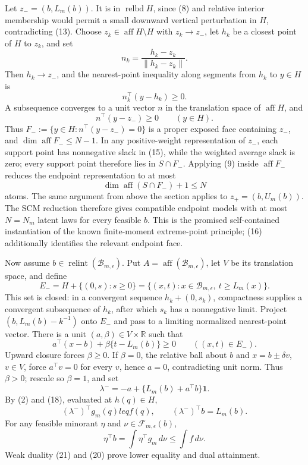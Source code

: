 Let \(z_-=(b,L_m(b))\).  It is in \(\operatorname{relbd}H\), since (8) and relative interior membership would permit a small downward vertical perturbation in \(H\), contradicting (13).  Choose \(z_k\in\operatorname{aff}H\setminus H\) with \(z_k\to z_-\), let \(h_k\) be a closest point of \(H\) to \(z_k\), and set
\[
 n_k=\frac{h_k-z_k}{\lVert h_k-z_k\rVert}.
\]
Then \(h_k\to z_-\), and the nearest-point inequality along segments from \(h_k\) to \(y\in H\) is
\[
 n_k^{\top}(y-h_k)\geq0.
\tag{14}
\]
A subsequence converges to a unit vector \(n\) in the translation space of \(\operatorname{aff}H\), and
\[
 n^{\top}(y-z_-)\geq0\qquad(y\in H).
\tag{15}
\]
Thus \(F_-:=\{y\in H:n^{\top}(y-z_-)=0\}\) is a proper exposed face containing \(z_-\), and \(\dim\operatorname{aff}F_-\leq N-1\).  In any positive-weight representation of \(z_-\), each support point has nonnegative slack in (15), while the weighted average slack is zero; every support point therefore lies in \(S\cap F_-\).  Applying (9) inside \(\operatorname{aff}F_-\) reduces the endpoint representation to at most
\[
 \dim\operatorname{aff}(S\cap F_-)+1\leq N
\tag{16}
\]
atoms.  The same argument from above the section applies to \(z_+=(b,U_m(b))\).  The SCM reduction therefore gives compatible endpoint models with at most \(N=N_m\) latent laws for every feasible \(b\).  This is the promised self-contained instantiation of the known finite-moment extreme-point principle; (16) additionally identifies the relevant endpoint face.

Now assume \(b\in\operatorname{relint}(\mathcal B_{m,\epsilon})\).  Put \(A=\operatorname{aff}(\mathcal B_{m,\epsilon})\), let \(V\) be its translation space, and define
\[
 E_-=H+\{(0,s):s\geq0\}
 =\{(x,t):x\in\mathcal B_{m,\epsilon},\ t\geq L_m(x)\}.
\tag{17}
\]
This set is closed: in a convergent sequence \(h_k+(0,s_k)\), compactness supplies a convergent subsequence of \(h_k\), after which \(s_k\) has a nonnegative limit.  Project \((b,L_m(b)-k^{-1})\) onto \(E_-\) and pass to a limiting normalized nearest-point vector.  There is a unit \((a,\beta)\in V\times\mathbb R\) such that
\[
 a^{\top}(x-b)+\beta\{t-L_m(b)\}\geq0
 \qquad((x,t)\in E_-).
\tag{18}
\]
Upward closure forces \(\beta\geq0\).  If \(\beta=0\), the relative ball about \(b\) and \(x=b\pm\delta v\), \(v\in V\), force \(a^{\top}v=0\) for every \(v\), hence \(a=0\), contradicting unit norm.  Thus \(\beta>0\); rescale so \(\beta=1\), and set
\[
 \lambda^-=-a+\{L_m(b)+a^{\top}b\}\mathbf1.
\tag{19}
\]
By (2) and (18), evaluated at \(h(q)\in H\),
\[
 (\lambda^-)^{\top}g_m(q)leq f(q),
 \qquad (\lambda^-)^{\top}b=L_m(b).
\tag{20}
\]
For any feasible minorant \(\eta\) and \(\nu\in\mathcal F_{m,\epsilon}(b)\),
\[
 \eta^{\top}b=\int\eta^{\top}g_m\,d\nu\leq\int f\,d\nu.
\tag{21}
\]
Weak duality (21) and (20) prove lower equality and dual attainment.


